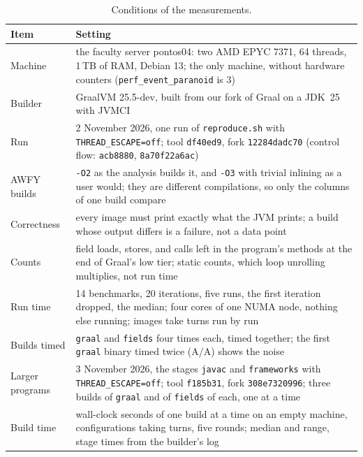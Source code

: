 \begin{table}[t]
    \centering
    \caption{Conditions of the measurements.}
    \label{tab:eval-conditions}
    \footnotesize
    \begin{tabular}{p{2.6cm}p{9.6cm}}
        \toprule
        Item & Setting \\
        \midrule
        Machine   & the faculty server pontos04: two AMD EPYC 7371, 64 threads, 1\,TB of RAM, Debian 13; the only machine, without hardware counters (\texttt{perf\_event\_paranoid} is 3) \\
        Builder   & GraalVM 25.5-dev, built from our fork of Graal on a JDK~25 with JVMCI \\
        Run       & 2 November 2026, one run of \texttt{reproduce.sh} with \texttt{THREAD\_ESCAPE=off}; tool \texttt{df40ed9}, fork \texttt{12284dadc70} (control flow: \texttt{acb8880}, \texttt{8a70f22a6ac}) \\
        AWFY builds & \texttt{-O2} as the analysis builds it, and \texttt{-O3} with trivial inlining as a user would; they are different compilations, so only the columns of one build compare \\
        Correctness & every image must print exactly what the JVM prints; a build whose output differs is a failure, not a data point \\
        Counts    & field loads, stores, and calls left in the program's methods at the end of Graal's low tier; static counts, which loop unrolling multiplies, not run time \\
        Run time  & 14 benchmarks, 20 iterations, five runs, the first iteration dropped, the median; four cores of one NUMA node, nothing else running; images take turns run by run \\
        Builds timed & \texttt{graal} and \texttt{fields} four times each, timed together; the first \texttt{graal} binary timed twice (A/A) shows the noise \\
        Larger programs & 3 November 2026, the stages \texttt{javac} and \texttt{frameworks} with \texttt{THREAD\_ESCAPE=off}; tool \texttt{f185b31}, fork \texttt{308e7320996}; three builds of \texttt{graal} and of \texttt{fields} of each, one at a time \\
        Build time & wall-clock seconds of one build at a time on an empty machine, configurations taking turns, five rounds; median and range, stage times from the builder's log \\
        \bottomrule
    \end{tabular}
\end{table}

